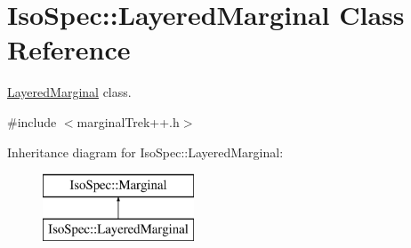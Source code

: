 \hypertarget{class_iso_spec_1_1_layered_marginal}{}\section{Iso\+Spec\+:\+:Layered\+Marginal Class Reference}
\label{class_iso_spec_1_1_layered_marginal}


\mbox{\hyperlink{class_iso_spec_1_1_layered_marginal}{Layered\+Marginal}} class.  




{\ttfamily \#include $<$marginal\+Trek++.\+h$>$}

Inheritance diagram for Iso\+Spec\+:\+:Layered\+Marginal\+:\begin{figure}[H]
\begin{center}
\leavevmode
\includegraphics[height=2.000000cm]{class_iso_spec_1_1_layered_marginal}
\end{center}
\end{figure}
